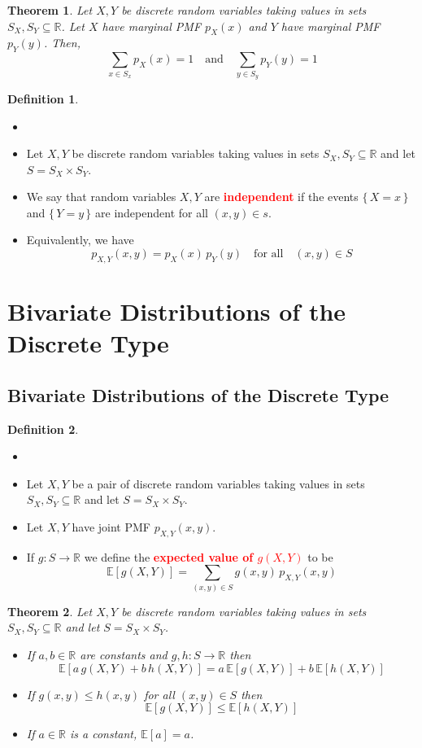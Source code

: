 \documentclass{article}
\newcommand{\R}{\mathbb{R}}
\newcommand{\E}{\mathbb{E}}
\newcommand{\bfred}[1]{\textcolor{red}{\textbf{#1}}}
\theoremstyle{plain}
\newtheorem{thm}{Theorem}[section]
\theoremstyle{definition}
\newtheorem{defn}{Definition}[section]
\theoremstyle{remark}
\begin{document}
\begin{thm}
    Let $X,Y$ be discrete random variables taking values in sets $S_X,S_Y\subseteq\R$. Let $X$ have marginal PMF $p_X(x)$ and $Y$ have marginal PMF $p_Y(y)$. Then, \[\sum_{x\in S_x}p_X(x)=1\quad\text{and}\quad\sum_{y\in S_y}p_Y(y)=1\]
\end{thm}

\begin{defn}
    \begin{itemize}
        \item []
        \item Let $X,Y$ be discrete random variables taking values in sets $S_X,S_Y\subseteq\R$ and let $S=S_X\times S_Y$.
        \item We say that random variables $X,Y$ are \bfred{independent} if the events $\{\,X=x\,\}$ and $\{\,Y=y\,\}$ are independent for all $(x,y)\in s$.
        \item Equivalently, we have \[p_{X,Y}(x,y)=p_X(x)\,p_Y(y)\quad\text{for all}\quad(x,y)\in S\]
    \end{itemize}
\end{defn}

\section{Bivariate Distributions of the Discrete Type}

\subsection{Bivariate Distributions of the Discrete Type}

\begin{defn}
    \begin{itemize}
        \item []
        \item Let $X,Y$ be a pair of discrete random variables taking values in sets $S_X,S_Y\subseteq\R$ and let $S=S_X\times S_Y$.
        \item Let $X,Y$ have joint PMF $p_{X,Y}(x,y)$.
        \item If $g:S\rightarrow\R$ we define the \bfred{expected value of $g(X,Y)$} to be \[\E[g(X,Y)]=\sum_{(x,y)\in S}g(x,y)\,p_{X,Y}(x,y)\]
    \end{itemize}
\end{defn}

\begin{thm}
    Let $X,Y$ be discrete random variables taking values in sets $S_X,S_Y\subseteq\R$ and let $S=S_X\times S_Y$.
    \begin{itemize}
        \item If $a,b\in\R$ are constants and $g,h:S\rightarrow\R$ then \[\E[a\,g(X,Y)+b\,h(X,Y)]=a\,\E[g(X,Y)]+b\,\E[h(X,Y)]\]
        \item If $g(x,y)\leq h(x,y)$ for all $(x,y)\in S$ then \[\E[g(X,Y)]\leq\E[h(X,Y)]\]
        \item If $a\in\R$ is a constant, $\E[a]=a$.
    \end{itemize}
\end{thm}
\end{document}
